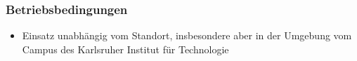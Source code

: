 \subsubsection{Betriebsbedingungen}

\begin{itemize}
	\item Einsatz unabhängig vom Standort, insbesondere aber in der Umgebung vom Campus des Karlsruher Institut für Technologie
\end{itemize}